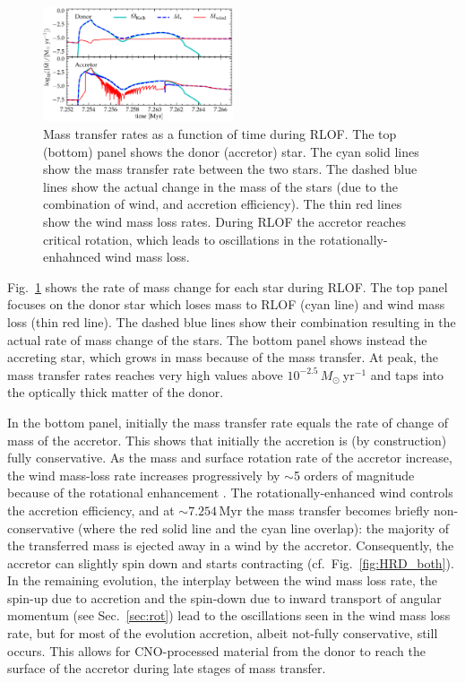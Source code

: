 \documentclass[twocolumn,twocolappendix,trackchanges]{aastex63}
\DeclareRobustCommand{\Figref}[1]{Fig.~\ref{#1}}
\DeclareRobustCommand{\Secref}[1]{Sec.~\ref{#1}}
\begin{document}
\begin{figure}[htbp]
  \includegraphics[width=0.5\textwidth]{MT}
  \caption{Mass transfer rates as a function of time during RLOF. The top (bottom) panel
    shows the donor (accretor) star. The cyan solid lines show the
    mass transfer rate between the two stars. The dashed blue lines
    show the actual change in the mass of the stars (due to the
    combination of wind, and accretion efficiency). The thin red
    lines show the wind mass loss rates. During RLOF the accretor
    reaches critical rotation, which leads to oscillations in the
    rotationally-enhahnced wind mass loss.}
  \label{fig:MT}
\end{figure}

\Figref{fig:MT} shows the rate of mass change for each star during
RLOF. The top panel focuses on the donor star which loses mass to RLOF
(cyan line) and wind mass loss (thin red line). The dashed blue lines
show their combination resulting in the actual rate of mass change of
the stars. The bottom panel shows instead the accreting star, which
grows in mass because of the mass transfer. At peak, the mass transfer
rates reaches very high values above
$10^{-2.5}\,M_\odot\ \mathrm{yr^{-1}}$ and taps into the optically
thick matter of the donor.

In the bottom panel, initially the mass transfer rate equals the rate
of change of mass of the accretor. This shows that initially the
accretion is (by construction) fully conservative. As the mass and
surface rotation rate of the accretor increase, the wind mass-loss
rate increases progressively by $\sim$5 orders of magnitude because of
the rotational enhancement \citep{langer:98}. The
rotationally-enhanced wind controls the accretion efficiency, and at
$\sim$$7.254$\,Myr the mass transfer becomes briefly non-conservative (where the red solid line and the cyan line overlap): the majority of the transferred mass is ejected away in a wind by the accretor. Consequently, the accretor can slightly spin down and starts contracting (cf.~\Figref{fig:HRD_both}). In the remaining evolution, the interplay between the wind mass loss rate, the spin-up due to accretion and the spin-down due to inward transport of angular momentum (see \Secref{sec:rot}) lead to the oscillations seen in the wind mass loss rate, but for most of the evolution accretion, albeit not-fully conservative, still occurs. This allows for CNO-processed material from the donor to reach the surface of the accretor during late stages of mass transfer.
\end{document}
